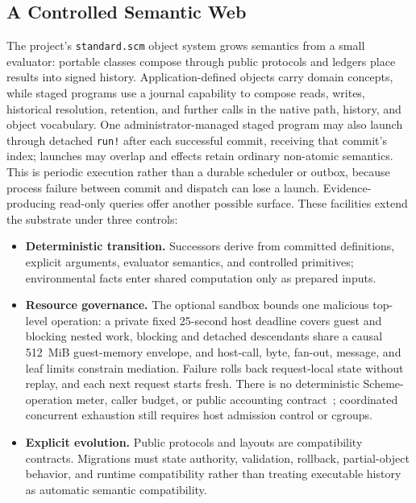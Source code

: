 \subsection{A Controlled Semantic Web}

The project’s \texttt{standard.scm} object system grows semantics from a small evaluator: portable classes compose through public protocols and ledgers place results into signed history. Application-defined objects carry domain concepts, while staged programs use a journal capability to compose reads, writes, historical resolution, retention, and further calls in the native path, history, and object vocabulary. One administrator-managed staged program may also launch through detached \texttt{run!} after each successful commit, receiving that commit's index; launches may overlap and effects retain ordinary non-atomic semantics. This is periodic execution rather than a durable scheduler or outbox, because process failure between commit and dispatch can lose a launch. Evidence-producing read-only queries offer another possible surface. These facilities extend the substrate under three controls:

\begin{itemize}[nosep]
  \item \textbf{Deterministic transition.} Successors derive from committed definitions, explicit arguments, evaluator semantics, and controlled primitives; environmental facts enter shared computation only as prepared inputs.
  \item \textbf{Resource governance.} The optional sandbox bounds one malicious top-level operation: a private fixed 25-second host deadline covers guest and blocking nested work, blocking and detached descendants share a causal 512~MiB guest-memory envelope, and host-call, byte, fan-out, message, and leaf limits constrain mediation. Failure rolls back request-local state without replay, and each next request starts fresh. There is no deterministic Scheme-operation meter, caller budget, or public accounting contract~\cite{Levy1995safe,Necula1997proof}; coordinated concurrent exhaustion still requires host admission control or cgroups.
  \item \textbf{Explicit evolution.} Public protocols and layouts are compatibility contracts. Migrations must state authority, validation, rollback, partial-object behavior, and runtime compatibility rather than treating executable history as automatic semantic compatibility.
\end{itemize}